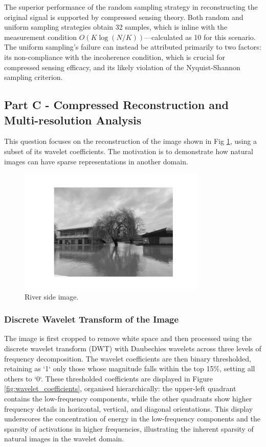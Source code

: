 \documentclass[11pt]{article}
\begin{document}
The superior performance of the random sampling strategy in reconstructing the original signal is supported by compressed sensing theory. Both random and uniform sampling strategies obtain 32 samples, which is inline with the measurement condition \(O(K \log(N/K))\)—calculated as 10 for this scenario. The uniform sampling's failure can instead be attributed primarily to two factors: its non-compliance with the incoherence condition, which is crucial for compressed sensing efficacy, and its likely violation of the Nyquist-Shannon sampling criterion.

\subsection{Part C - Compressed Reconstruction and Multi-resolution Analysis}
This question focuses on the reconstruction of the image shown in Fig \ref{fig:river_side}, using a subset of its wavelet coefficients. The motivation is to demonstrate how natural images can have sparse representations in another domain.
\begin{figure}[H]
    \centering
    \includegraphics[width=0.8\textwidth]{../data/river_side.jpeg}
    \caption{River side image.}
    \label{fig:river_side}
\end{figure}

\subsubsection{Discrete Wavelet Transform of the Image}
The image is first cropped to remove white space and then processed using the discrete wavelet transform (DWT) with Daubechies wavelets across three levels of frequency decomposition. The wavelet coefficients are then binary thresholded, retaining as `1` only those whose magnitude falls within the top 15\%, setting all others to `0`. These thresholded coefficients are displayed in Figure \ref{fig:wavelet_coefficients}, organised hierarchically: the upper-left quadrant contains the low-frequency components, while the other quadrants show higher frequency details in horizontal, vertical, and diagonal orientations. This display underscores the concentration of energy in the low-frequency components and the sparsity of activations in higher frequencies, illustrating the inherent sparsity of natural images in the wavelet domain.
\end{document}
